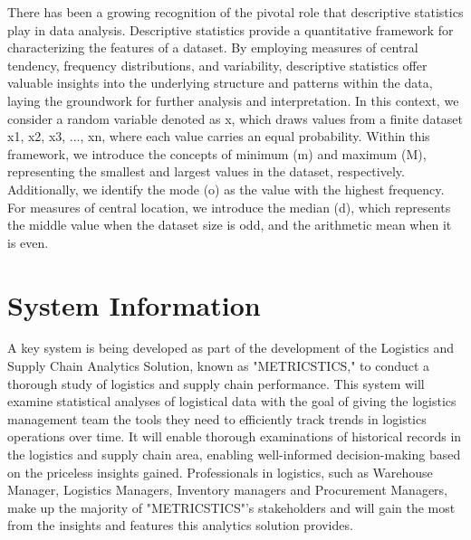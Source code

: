 \documentclass[english,12pt,a4paper]{report}
\begin{document}
	 There has been a growing recognition of the pivotal role that descriptive statistics play in data analysis. Descriptive statistics provide a quantitative framework for characterizing the features of a dataset. By employing measures of central tendency, frequency distributions, and variability, descriptive statistics offer valuable insights into the underlying structure and patterns within the data, laying the groundwork for further analysis and interpretation. In this context, we consider a random variable denoted as x, which draws values from a finite dataset {x1, x2, x3, ..., xn}, where each value carries an equal probability. Within this framework, we introduce the concepts of minimum (m) and maximum (M), representing the smallest and largest values in the dataset, respectively. Additionally, we identify the mode (o) as the value with the highest frequency. For measures of central location, we introduce the median (d), which represents the middle value when the dataset size is odd, and the arithmetic mean when it is even.
	\section{System Information}
	A key system is being developed as part of the development of the Logistics and Supply Chain 	Analytics Solution, known as "METRICSTICS," to conduct a thorough study of logistics and supply chain performance. This system will examine statistical analyses of logistical data with the goal of giving the logistics management team the tools they need to efficiently track trends in logistics operations over time. It will enable thorough examinations of historical records in the logistics and supply chain area, enabling well-informed decision-making based on the priceless insights gained. Professionals in logistics, such as Warehouse Manager, Logistics Managers, Inventory managers and Procurement Managers, make up the majority of "METRICSTICS"'s stakeholders and will gain the most from the insights and features this analytics solution provides.
	
\end{document}
